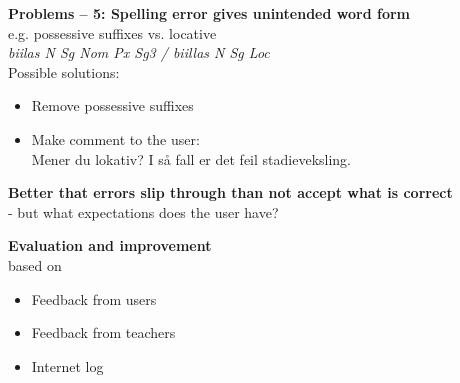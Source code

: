 \documentclass[landscape,norsk,11pt]{seminar}
\begin{document}
\begin{slide}
\newslide
\textbf{Problems -- 5: Spelling error gives unintended word form} \\
e.g. possessive suffixes vs. locative \\
\textit{biilas N Sg Nom Px Sg3 / biillas N Sg Loc} \\

Possible solutions:
\begin{itemize}
\item Remove possessive suffixes
\item Make comment to the user: \\
Mener du lokativ? I så fall er det feil stadieveksling.
\end{itemize}







\newslide
\textbf{Better that errors slip through than not accept what is correct} \\

- but what expectations does the user have?

\newslide
\textbf{Evaluation and improvement}\\
based on
\begin{itemize}
\item{Feedback from users}
\item{Feedback from teachers}
\item{Internet log}
\end{itemize}


\end{slide}
\end{document}

